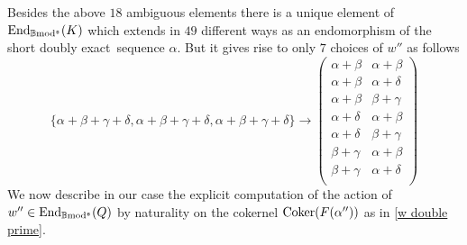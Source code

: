 \documentclass[12pt]{article}
\def\End{{\rm End}}
\def\coker{{\rm Coker}}
\def\B{{\mathbb B}}
\def\exxx{{doubly exact}~}
\def\End{{\mbox{End}}}
\def\b2{{\rm \B mod^{\mathfrak s}}}
\begin{document}
Besides the above $18$ ambiguous elements there is a unique element of $\End_\b2(K)$ which extends in $49$ different ways as an endomorphism of the short \exxx sequence $\alpha$. But it gives rise to only $7$ choices of $w''$ as follows
$$
\{\alpha +\beta +\gamma +\delta ,\alpha +\beta +\gamma +\delta ,\alpha +\beta +\gamma +\delta \}\to \left(
\begin{array}{cc}
 \alpha +\beta  & \alpha +\beta  \\
 \alpha +\beta  & \alpha +\delta  \\
 \alpha +\beta  & \beta +\gamma  \\
 \alpha +\delta  & \alpha +\beta  \\
 \alpha +\delta  & \beta +\gamma  \\
 \beta +\gamma  & \alpha +\beta  \\
 \beta +\gamma  & \alpha +\delta  \\
\end{array}
\right)
$$
We now describe in our case the explicit computation of the action of $w''\in \End_\b2(Q)$ by naturality on the cokernel $\coker(F(\alpha''))$ as in \eqref{w double prime}. 
\end{document}
